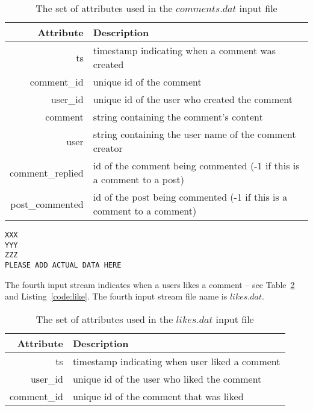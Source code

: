 \documentclass{sig-alternate}
\begin{document}
\begin{table}[ht]
	\caption{The set of attributes used in the $comments.dat$ input file}
	\centering 
	\begin{tabular}{r p{5.2cm}}
		\toprule
		Attribute		&	 Description\\
		\midrule
		ts			&	timestamp indicating when a comment was created\\[2ex]
		comment\_id	&	unique id of the comment\\[2ex]
		user\_id	&	unique id of the user who created the comment\\[2ex]		
		comment		& 	string containing the comment's content\\[2ex]		
		user		&   string containing the user name of the comment creator\\[2ex]
		comment\_replied		&   id of the comment being commented (-1 if this is a comment to a post)\\[2ex]
		post\_commented		&   id of the post being commented (-1 if this is a comment to a comment)\\[2ex]
		\bottomrule 
	\end{tabular}
	\label{table:comment}
\end{table}



\lstset{}
\begin{lstlisting}[float=ht,caption={First line from the $comments.dat$ file -- one attribute per line of listing},label={code:comment}]
XXX
YYY
ZZZ
PLEASE ADD ACTUAL DATA HERE
\end{lstlisting}

The fourth input stream indicates when a users likes a comment -- see Table~\ref{table:like} and Listing~\ref{code:like}. The fourth input stream file name is $likes.dat$.

\begin{table}[ht]
	\caption{The set of attributes used in the $likes.dat$ input file}
	\centering 
	\begin{tabular}{r p{5.2cm}}
		\toprule
		Attribute		&	 Description\\
		\midrule
		ts			&	timestamp indicating when user liked a comment\\[2ex]
		user\_id	&	unique id of the user who liked the comment\\[2ex]		
		comment\_id	& 	unique id of the comment that was liked\\[2ex]		
		\bottomrule 
	\end{tabular}
	\label{table:like}
\end{table}
\end{document}

